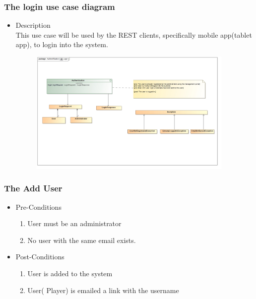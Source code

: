 \documentclass[english]{article}
\begin{document}
		\subsubsection* {The login use case diagram}
		\begin{itemize}
			\item Description\\
			This use case will be used by the REST clients, specifically mobile app(tablet app), to login into the system.
		\end{itemize}
		\includegraphics[width=14cm,height=6cm,keepaspectratio]{login.jpg}\\
		
		
		\subsubsection{The Add User}
		
			\begin{itemize}
	
		
		\item Pre-Conditions
			\begin{enumerate}
				\item User must be an administrator
				\item No user with the same email exists.
			\end{enumerate}
		\item Post-Conditions
			\begin{enumerate}
			\item User is added to the system
			\item User( Player) is emailed a link with the username
						
			\end{enumerate}
	

\end{itemize}
		
		
\end{document}
